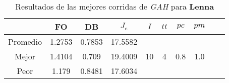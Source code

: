 \begin{table}[h!]
\footnotesize
\begin{center}
\begin{tabular}{|c|c|c|c|c|c|c|c|c|c|}
\hline
& {\bf FO} & {\bf DB}& $J_e$ & $I$ & $tt$ & $pc$ & $pm$ \\
\hline
\hline
Promedio   & 1.2753 & 0.7853  & 17.5582 &  &  &  & \\
\cline{1-4}
Mejor & 1.4104 & 0.709  & 19.4009 & 10 & 4 & 0.8 & 1.0\\
\cline{1-4}
Peor & 1.179 & 0.8481  & 17.6034 &  &  &  & \\\hline
\end{tabular}
\caption{Resultados de las mejores corridas de \emph{GAH} para {\bf Lenna}}
\label{tb:pmpgahibimg}
\end{center}
\end{table}
